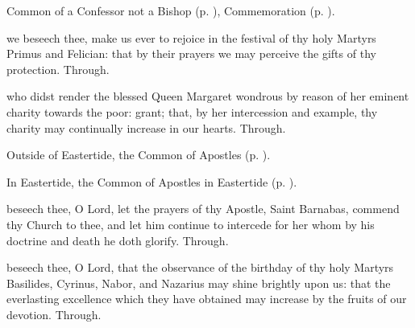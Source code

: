

\begin{rubric}
	Common of a Confessor not a Bishop (p. \pageref{CommonConfessorNotBishop}), Commemoration  (p. \pageref{PrimusFelician}).
\end{rubric}


\clearpage
{}\label{PrimusFelician}

\memorialCollect
{} we beseech thee, make us ever to rejoice in the festival of thy holy Martyrs Primus and Felician: that by their prayers we may perceive the gifts of thy protection. Through.



\memorialCollect
{} who didst render the blessed Queen Margaret wondrous by reason of her eminent charity towards the poor: grant; that, by her intercession and example, thy charity may continually increase in our hearts. Through.



\begin{rubric}
	Outside of Eastertide, the Common of Apostles (p. \pageref{CommonApostles}).
\end{rubric}

\begin{rubric}
	In Eastertide, the Common of Apostles in Eastertide (p. \pageref{CommonApostlesEaster}).
\end{rubric}

{} beseech thee, O Lord, let the prayers of thy Apostle, Saint Barnabas, commend thy Church to thee, and let him continue to intercede for her whom by his doctrine and death he doth glorify. Through.



\memorialCollect
{} beseech thee, O Lord, that the observance of the birthday of thy holy Martyrs Basilides, Cyrinus, Nabor, and Nazarius may shine brightly upon us: that the everlasting excellence which they have obtained may increase by the fruits of our devotion. Through.


